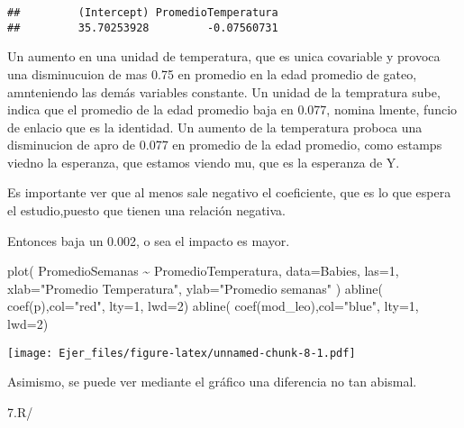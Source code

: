 \documentclass[
]{article}
\newenvironment{Shaded}{\begin{snugshade}}{\end{snugshade}}
\newcommand{\AttributeTok}[1]{\textcolor[rgb]{0.77,0.63,0.00}{#1}}
\newcommand{\DecValTok}[1]{\textcolor[rgb]{0.00,0.00,0.81}{#1}}
\newcommand{\FunctionTok}[1]{\textcolor[rgb]{0.00,0.00,0.00}{#1}}
\newcommand{\NormalTok}[1]{#1}
\newcommand{\SpecialCharTok}[1]{\textcolor[rgb]{0.00,0.00,0.00}{#1}}
\newcommand{\StringTok}[1]{\textcolor[rgb]{0.31,0.60,0.02}{#1}}
\begin{document}
\begin{verbatim}
##         (Intercept) PromedioTemperatura 
##         35.70253928         -0.07560731
\end{verbatim}

Un aumento en una unidad de temperatura, que es unica covariable y
provoca una disminucuion de mas 0.75 en promedio en la edad promedio de
gateo, amnteniendo las demás variables constante. Un unidad de la
tempratura sube, indica que el promedio de la edad promedio baja en
0.077, nomina lmente, funcio de enlacio que es la identidad. Un aumento
de la temperatura proboca una disminucion de apro de 0.077 en promedio
de la edad promedio, como estamps viedno la esperanza, que estamos
viendo mu, que es la esperanza de Y.

Es importante ver que al menos sale negativo el coeficiente, que es lo
que espera el estudio,puesto que tienen una relación negativa.

Entonces baja un 0.002, o sea el impacto es mayor.

\begin{Shaded}
\begin{Highlighting}[]
\FunctionTok{plot}\NormalTok{( PromedioSemanas }\SpecialCharTok{\textasciitilde{}}\NormalTok{ PromedioTemperatura, }\AttributeTok{data=}\NormalTok{Babies, }\AttributeTok{las=}\DecValTok{1}\NormalTok{,}
\AttributeTok{xlab=}\StringTok{"Promedio Temperatura"}\NormalTok{, }\AttributeTok{ylab=}\StringTok{"Promedio semanas"}\NormalTok{ )}
\FunctionTok{abline}\NormalTok{( }\FunctionTok{coef}\NormalTok{(p),}\AttributeTok{col=}\StringTok{"red"}\NormalTok{, }\AttributeTok{lty=}\DecValTok{1}\NormalTok{, }\AttributeTok{lwd=}\DecValTok{2}\NormalTok{)}
\FunctionTok{abline}\NormalTok{( }\FunctionTok{coef}\NormalTok{(mod\_leo),}\AttributeTok{col=}\StringTok{"blue"}\NormalTok{, }\AttributeTok{lty=}\DecValTok{1}\NormalTok{, }\AttributeTok{lwd=}\DecValTok{2}\NormalTok{)}
\end{Highlighting}
\end{Shaded}

\texttt{[image: Ejer\_files/figure-latex/unnamed-chunk-8-1.pdf]}

Asimismo, se puede ver mediante el gráfico una diferencia no tan
abismal.

7.R/
\end{document}
